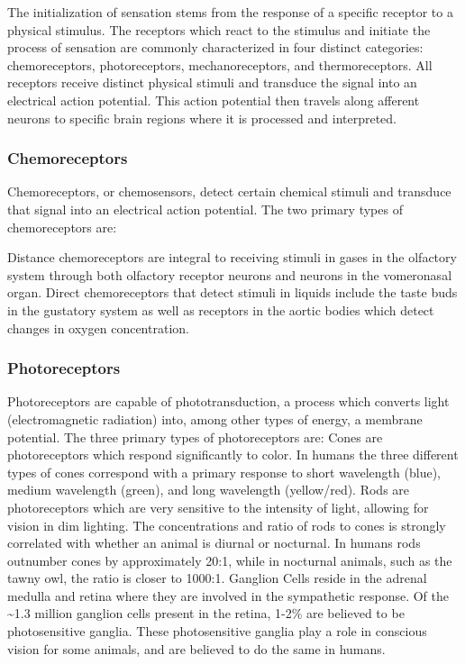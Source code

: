 The initialization of sensation stems from the response of a specific
receptor to a physical stimulus. The receptors which react to the
stimulus and initiate the process of sensation are commonly
characterized in four distinct categories: chemoreceptors,
photoreceptors, mechanoreceptors, and thermoreceptors. All receptors
receive distinct physical stimuli and transduce the signal into an
electrical action potential. This action potential then travels along
afferent neurons to specific brain regions where it is processed and
interpreted.

\hypertarget{chemoreceptors}{%
\subsubsection{Chemoreceptors}\label{chemoreceptors}}

Chemoreceptors, or chemosensors, detect certain chemical stimuli and
transduce that signal into an electrical action potential. The two
primary types of chemoreceptors are:

Distance chemoreceptors are integral to receiving stimuli in gases in
the olfactory system through both olfactory receptor neurons and neurons
in the vomeronasal organ. Direct chemoreceptors that detect stimuli in
liquids include the taste buds in the gustatory system as well as
receptors in the aortic bodies which detect changes in oxygen
concentration.

\hypertarget{photoreceptors}{%
\subsubsection{Photoreceptors}\label{photoreceptors}}

Photoreceptors are capable of phototransduction, a process which
converts light (electromagnetic radiation) into, among other types of
energy, a membrane potential. The three primary types of photoreceptors
are: Cones are photoreceptors which respond significantly to color. In
humans the three different types of cones correspond with a primary
response to short wavelength (blue), medium wavelength (green), and long
wavelength (yellow/red). Rods are photoreceptors which are very
sensitive to the intensity of light, allowing for vision in dim
lighting. The concentrations and ratio of rods to cones is strongly
correlated with whether an animal is diurnal or nocturnal. In humans
rods outnumber cones by approximately 20:1, while in nocturnal animals,
such as the tawny owl, the ratio is closer to 1000:1. Ganglion Cells
reside in the adrenal medulla and retina where they are involved in the
sympathetic response. Of the \textasciitilde1.3 million ganglion cells
present in the retina, 1-2\% are believed to be photosensitive ganglia.
These photosensitive ganglia play a role in conscious vision for some
animals, and are believed to do the same in humans.

